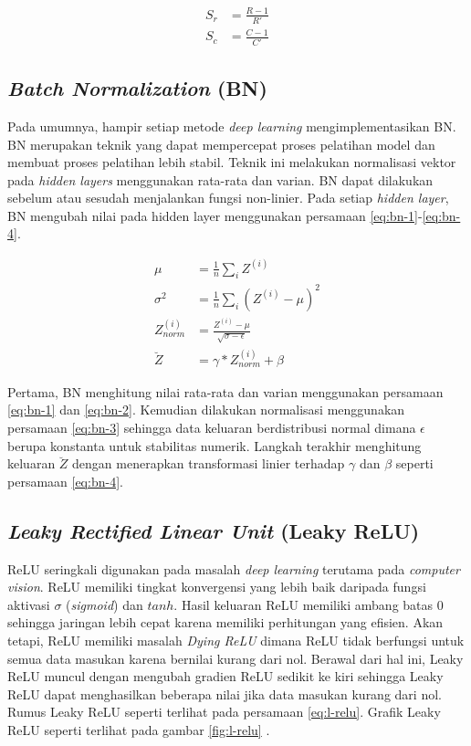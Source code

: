     \begin{align}
        \label{eq:upsample}
        S_r &= \frac{R-1}{R'}\nonumber\\
        S_c &= \frac{C-1}{C'}
    \end{align}

    \subsection{\textit{Batch Normalization} (BN)}
    Pada umumnya, hampir setiap metode \textit{deep learning} mengimplementasikan BN. BN merupakan teknik yang dapat mempercepat proses pelatihan model dan membuat proses pelatihan lebih stabil. Teknik ini melakukan normalisasi vektor pada \textit{hidden layers} menggunakan rata-rata dan varian. BN dapat dilakukan sebelum atau sesudah menjalankan fungsi non-linier. Pada setiap \textit{hidden layer}, BN mengubah nilai pada hidden layer menggunakan persamaan \ref{eq:bn-1}-\ref{eq:bn-4}.

    \begin{align}
        \label{eq:bn-1}
        \mu &= \frac{1}{n} \sum_i Z^{(i)}\\
        \label{eq:bn-2}
        \sigma^2 &= \frac{1}{n} \sum_i (Z^{(i)}-\mu)^2\\
        \label{eq:bn-3}
        Z^{(i)}_{norm} &= \frac{Z^{(i)}-\mu}{\sqrt{\sigma-\epsilon}}\\
        \label{eq:bn-4}
        \breve{Z} &= \gamma \ast Z^{(i)}_{norm}+\beta
    \end{align}

    Pertama, BN menghitung nilai rata-rata dan varian menggunakan persamaan \ref{eq:bn-1} dan \ref{eq:bn-2}. Kemudian dilakukan normalisasi menggunakan persamaan \ref{eq:bn-3} sehingga data keluaran berdistribusi normal dimana $\epsilon$ berupa konstanta untuk stabilitas numerik. Langkah terakhir menghitung keluaran $\breve{Z}$ dengan menerapkan transformasi linier terhadap $\gamma$ dan $\beta$ seperti persamaan \ref{eq:bn-4}.

    \subsection{\textit{Leaky Rectified Linear Unit} (Leaky ReLU)}
    ReLU seringkali digunakan pada masalah \textit{deep learning} terutama pada \textit{computer vision}. ReLU memiliki tingkat konvergensi yang lebih baik daripada fungsi aktivasi $\sigma$ (\textit{sigmoid}) dan $tanh$. Hasil keluaran ReLU memiliki ambang batas $0$ sehingga jaringan lebih cepat karena memiliki perhitungan yang efisien. Akan tetapi, ReLU memiliki masalah \textit{Dying ReLU} dimana ReLU tidak berfungsi untuk semua data masukan karena bernilai kurang dari nol. Berawal dari hal ini, Leaky ReLU muncul dengan mengubah gradien ReLU sedikit ke kiri sehingga Leaky ReLU dapat menghasilkan beberapa nilai jika data masukan kurang dari nol. Rumus Leaky ReLU seperti terlihat pada persamaan \ref{eq:l-relu}. Grafik Leaky ReLU seperti terlihat pada gambar \ref{fig:l-relu} \citep{Xu2015}.

